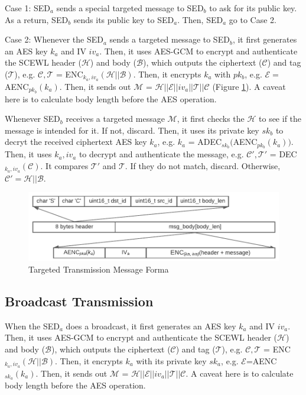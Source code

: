 \documentclass[11pt,oneside,onecolumn,letterpaper]{article}
\begin{document}
Case 1: SED$_a$ sends a special targeted message to SED$_b$ to ask for its public key.
As a return, SED$_b$ sends its public key to SED$_a$. Then, SED$_a$ go to Case 2.

Case 2: Whenever the SED$_a$ sends a targeted message to SED$_b$, it first generates an AES key $k_a$ and IV $iv_a$. 
Then, it uses AES-GCM to encrypt and authenticate the SCEWL header ($\mathcal{H}$) and body ($\mathcal{B}$), which outputs the ciphertext ($\mathcal{C}$) and tag ($\mathcal{T}$), e.g. $\mathcal{C}, \mathcal{T}$ = ENC$_{k_a, iv_a}(\mathcal{H} || \mathcal{B})$.
Then, it encrypts $k_a$ with $pk_b$, e.g. $\mathcal{E}=$AENC$_{pk_b}(k_a)$.
Then, it sends out $\mathcal{M}$ = $\mathcal{H} || \mathcal{E}||iv_a||\mathcal{T}||\mathcal{C}$ (Figure \ref{fig:msg}).
A caveat here is to calculate body length before the AES operation.

Whenever SED$_b$ receives a targeted message $\mathcal{M}$, it first checks the $\mathcal{H}$ to see if the message is intended for it. If not, discard.
Then, it uses its private key $sk_b$ to decryt the received ciphertext AES key $k_a$, e.g. $k_a$ = ADEC$_{sk_b}($AENC$_{pk_b}(k_a))$.
Then, it uses $k_a, iv_a$ to decrypt and authenticate the message, e.g. $\mathcal{C'}, \mathcal{T'}$ = DEC$_{k_a, iv_a}(\mathcal{C})$.
It compares $\mathcal{T'}$ and $\mathcal{T}$.
If they do not match, discard.
Otherwise, $\mathcal{C'}=\mathcal{H}||\mathcal{B}$.

\begin{figure}[!htbp]
  \begin{centering}
  \includegraphics[width = .80\textwidth]{pic/msg-format.pdf}
  \caption{Targeted Transmission Message Forma}
  \label{fig:msg}
  \end{centering}
\end{figure}

\subsection{Broadcast Transmission}

When the SED$_a$ does a broadcast, it first generates an AES key $k_a$ and IV $iv_a$. 
Then, it uses AES-GCM to encrypt and authenticate the SCEWL header ($\mathcal{H}$) and body ($\mathcal{B}$), which outputs the ciphertext ($\mathcal{C}$) and tag ($\mathcal{T}$), e.g. $\mathcal{C}, \mathcal{T}$ = ENC$_{k_a, iv_a}(\mathcal{H} || \mathcal{B})$.
Then, it encrypts $k_a$ with its private key $sk_a$, e.g. $\mathcal{E}$=AENC$_{sk_a}(k_a)$.
Then, it sends out $\mathcal{M}$ = $\mathcal{H} || \mathcal{E}||iv_a||\mathcal{T}||\mathcal{C}$.
A caveat here is to calculate body length before the AES operation.
\end{document}
